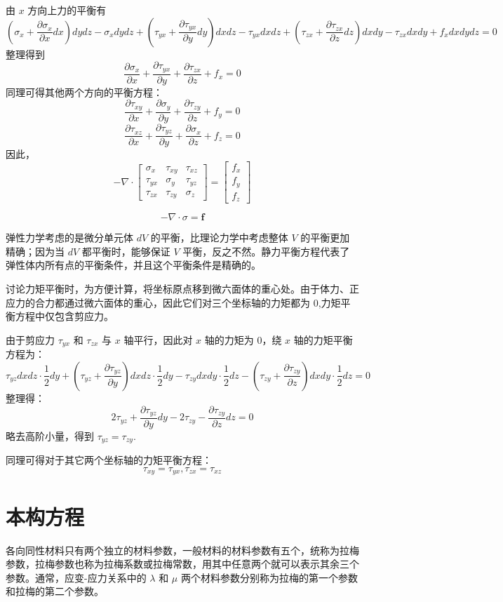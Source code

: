 \documentclass[12pt,a4paper]{article}
\begin{document}
由 $x$ 方向上力的平衡有
$$
(\sigma_x+\frac{\partial\sigma_x}{\partial x}dx)dydz-\sigma_x dydz+(\tau_{yx}+\frac{\partial\tau_{yx}}{\partial y}dy)dxdz-\tau_{yx}dxdz+(\tau_{zx}+\frac{\partial\tau_{zx}}{\partial z}dz)dxdy-\tau_{zx}dxdy+f_xdxdydz=0
$$
整理得到
$$
\frac{\partial\sigma_x}{\partial x}+\frac{\partial\tau_{yx}}{\partial y}+\frac{\partial\tau_{zx}}{\partial z}+f_x=0
$$
同理可得其他两个方向的平衡方程：
$$
\frac{\partial\tau_{xy}}{\partial x}+\frac{\partial\sigma_{y}}{\partial y}+\frac{\partial\tau_{zy}}{\partial z}+f_y=0
$$
$$
\frac{\partial\tau_{xz}}{\partial x}+\frac{\partial\tau_{yz}}{\partial y}+\frac{\partial\sigma_{x}}{\partial z}+f_z=0
$$
因此，
$$
-\nabla\cdot\begin{bmatrix}
\sigma _x & \tau_{xy} & \tau_{xz} \\
\tau_{yx} & \sigma _y & \tau_{yz} \\
\tau_{zx} & \tau_{zy} & \sigma _z
\end{bmatrix}=\begin{bmatrix}
f_x \\
f_y \\
f_z
\end{bmatrix}
$$

$$
-\nabla\cdot \sigma = \textbf{f}
$$

弹性力学考虑的是微分单元体 $dV$ 的平衡，比理论力学中考虑整体 $V$ 的平衡更加精确；因为当 $dV$ 都平衡时，能够保证 $V$ 平衡，反之不然。静力平衡方程代表了弹性体内所有点的平衡条件，并且这个平衡条件是精确的。

讨论力矩平衡时，为方便计算，将坐标原点移到微六面体的重心处。由于体力、正应力的合力都通过微六面体的重心，因此它们对三个坐标轴的力矩都为 $0$,力矩平衡方程中仅包含剪应力。

由于剪应力 $\tau_{yx}$ 和 $\tau_{zx}$ 与 $x$ 轴平行，因此对 $x$ 轴的力矩为 $0$，绕 $x$ 轴的力矩平衡方程为：
$$
\tau_{yz}dxdz\cdot\frac{1}{2}dy+(\tau_{yz}+\frac{\partial\tau_{yz}}{\partial y})dxdz\cdot\frac{1}{2}dy-\tau_{zy}dxdy\cdot\frac{1}{2}dz-(\tau_{zy}+\frac{\partial\tau_{zy}}{\partial z})dxdy\cdot\frac{1}{2}dz=0
$$
整理得：
$$
2\tau_{yz}+\frac{\partial\tau_{yz}}{\partial y}dy-2\tau_{zy}-\frac{\partial\tau_{zy}}{\partial z}dz=0
$$
略去高阶小量，得到 $\tau_{yz}=\tau_{zy}$.

同理可得对于其它两个坐标轴的力矩平衡方程：
$$
\tau_{xy}=\tau_{yx},\tau_{zx}=\tau_{xz}
$$

\section{本构方程}
各向同性材料只有两个独立的材料参数，一般材料的材料参数有五个，统称为拉梅参数，拉梅参数也称为拉梅系数或拉梅常数，用其中任意两个就可以表示其余三个参数。通常，应变-应力关系中的 $\lambda$ 和 $\mu$ 两个材料参数分别称为拉梅的第一个参数和拉梅的第二个参数。
\end{document}
